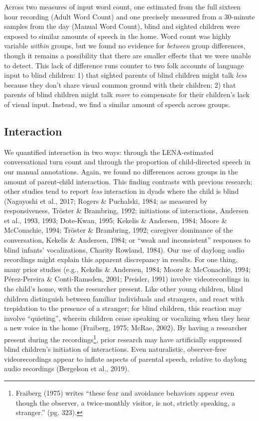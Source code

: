 \documentclass[
  man,floatsintext]{apa6}
\begin{document}
Across two measures of input word count, one estimated from the full sixteen hour recording (Adult Word Count) and one precisely measured from a 30-minute samples from the day (Manual Word Count), blind and sighted children were exposed to similar amounts of speech in the home. Word count was highly variable \emph{within} groups, but we found no evidence for \emph{between} group differences, though it remains a possibility that there are smaller effects that we were unable to detect. This lack of difference runs counter to two folk accounts of language input to blind children: 1) that sighted parents of blind children might talk \emph{less} because they don't share visual common ground with their children; 2) that parents of blind children might talk \emph{more} to compensate for their children's lack of visual input. Instead, we find a similar amount of speech across groups.

\hypertarget{interaction-2}{%
\subsection{Interaction}\label{interaction-2}}

We quantified interaction in two ways: through the LENA-estimated conversational turn count and through the proportion of child-directed speech in our manual annotations. Again, we found no differences across groups in the amount of parent-child interaction. This finding contrasts with previous research; other studies tend to report \emph{less} interaction in dyads where the child is blind (Nagayoshi et al., 2017; Rogers \& Puchalski, 1984; as measured by responsiveness, Tröster \& Brambring, 1992; initiations of interactions, Andersen et al., 1993, 1993; Dote-Kwan, 1995; Kekelis \& Andersen, 1984; Moore \& McConachie, 1994; Tröster \& Brambring, 1992; caregiver dominance of the conversation, Kekelis \& Andersen, 1984; or ``weak and inconsistent'' responses to blind infants' vocalizations, Charity Rowland, 1984). Our use of daylong audio recordings might explain this apparent discrepancy in results. For one thing, many prior studies (e.g., Kekelis \& Andersen, 1984; Moore \& McConachie, 1994; Pérez-Pereira \& Conti-Ramsden, 2001; Preisler, 1991) involve videorecordings in the child's home, with the researcher present. Like other young children, blind children distinguish between familiar individuals and strangers, and react with trepidation to the presence of a stranger; for blind children, this reaction may involve ``quieting'', wherein children cease speaking or vocalizing when they hear a new voice in the home (Fraiberg, 1975; McRae, 2002). By having a researcher present during the recordings\footnote{Fraiberg (1975) writes ``these fear and avoidance behaviors appear even though the observer, a twice-monthly visitor, is not, strictly speaking, a stranger.'' (pg. 323).}, prior research may have artificially suppressed blind children's initiation of interactions. Even naturalistic, observer-free videorecordings appear to inflate aspects of parental speech, relative to daylong audio recordings (Bergelson et al., 2019).
\end{document}
